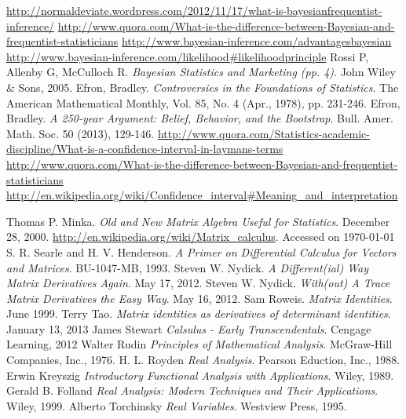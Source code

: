 \documentclass{book}
\begin{document}
\begin{thebibliography}{100}
 {\url{http://normaldeviate.wordpress.com/2012/11/17/what-is-bayesianfrequentist-inference/}}
 {\url{http://www.quora.com/What-is-the-difference-between-Bayesian-and-frequentist-statisticians}}
 {\url{http://www.bayesian-inference.com/advantagesbayesian}}
 {\url{http://www.bayesian-inference.com/likelihood#likelihoodprinciple}}
 Rossi P, Allenby G, McCulloch R. {\emph{Bayesian Statistics and Marketing (pp. 4)}}. John Wiley \& Sons, 2005.
 Efron, Bradley. {\emph{Controversies in the Foundations of Statistics}}. The American Mathematical Monthly, Vol. 85, No. 4 (Apr., 1978), pp. 231-246.
 Efron, Bradley. {\emph{A 250-year Argument: Belief, Behavior, and the Bootstrap}}. Bull. Amer. Math. Soc. 50 (2013), 129-146.
 {\url{http://www.quora.com/Statistics-academic-discipline/What-is-a-confidence-interval-in-laymans-terms}}
 {\url{http://www.quora.com/What-is-the-difference-between-Bayesian-and-frequentist-statisticians}}
 {\url{http://en.wikipedia.org/wiki/Confidence_interval#Meaning_and_interpretation}}

 Thomas P. Minka. {\em{Old and New Matrix Algebra Useful for Statistics}}. December 28, 2000.
 \url{http://en.wikipedia.org/wiki/Matrix_calculus}. Accessed on \today
{} S. R. Searle and H. V. Henderson. {\em{A Primer on Differential Calculus for Vectors and Matrices}}. BU-1047-MB, 1993.
 Steven W. Nydick. {\em{A Different(ial) Way Matrix Derivatives Again}}. May 17, 2012.
 Steven W. Nydick. {\em{With(out) A Trace Matrix Derivatives the Easy Way}}. May 16, 2012.
 Sam Roweis. {\em{Matrix Identities}}. June 1999.
 Terry Tao. {\em{Matrix identities as derivatives of determinant identities}}. January 13, 2013
 James Stewart {\em{Calsulus - Early Transcendentals}}. Cengage Learning, 2012
 Walter Rudin {\em{Principles of Mathematical Analysis}}. McGraw-Hill Companies, Inc., 1976.
 H. L. Royden {\em{Real Analysis}}. Pearson Eduction, Inc., 1988.
 Erwin Kreyszig {\em{Introductory Functional Analysis with Applications}}. Wiley, 1989.
 Gerald B. Folland {\em{Real Analysis: Modern Techniques and Their Applications}}. Wiley, 1999.
 Alberto Torchinsky {\em{Real Variables}}. Westview Press, 1995.


\end{thebibliography}
\end{document}
